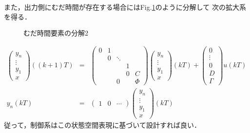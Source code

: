また，出力側にむだ時間が存在する場合にはFig.\ref{fig_delay2}のように分解して
次の拡大系を得る．
\begin{figure}[htbp]
 \begin{center}
  \caption{むだ時間要素の分解2}
  \label{fig_delay2}
 \end{center}
\end{figure}
\begin{eqnarray}
 \left(\begin{array}{c}
        y_n \\
	\vdots \\
	y_1 \\
	x
       \end{array}\right)
 ((k+1)T) &=&
 \left(\begin{array}{ccccc}
        0 & 1 &        &   & \\
	  & 0 & \ddots &   & \\
	  &   &        & 1 & \\
	  &   &        & 0 & C \\
	  &   & 0      &   & \Phi
	\end{array}\right)
 \left(\begin{array}{c}
        y_n \\
	\vdots \\
	y_1 \\
	x
       \end{array}\right)
 (kT) +
 \left(\begin{array}{c}
        0 \\
	\vdots \\
	0 \\
	D \\
	\Gamma
	\end{array}\right) u(kT) \\
 y_n(kT) &=&
  \left(\begin{array}{ccc}
         1 & 0 & \cdots
	\end{array}\right)
  \left(\begin{array}{c}
         y_n \\
	 \vdots \\
	 y_1 \\
	 x
	\end{array}\right)(kT)
\end{eqnarray}
従って，制御系はこの状態空間表現に基づいて設計すれば良い．
